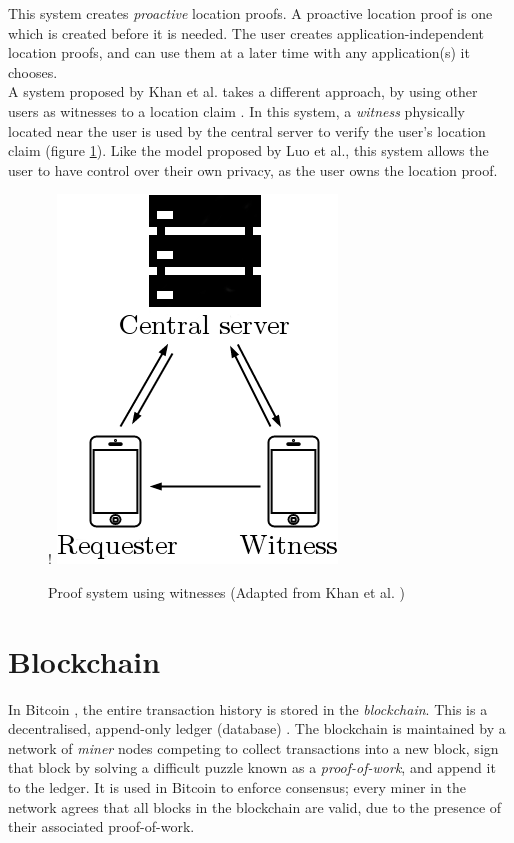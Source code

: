 This system creates \textit{proactive} location proofs. A proactive location proof is one which is created before it is needed. The user creates application-independent location proofs, and can use them at a later time with any application(s) it chooses.
\\

A system proposed by Khan et al. takes a different approach, by using other users as witnesses to a location claim \cite{khan}. In this system, a \textit{witness} physically located near the user is used by the central server to verify the user's location claim (figure \ref{fig:witness_paper}). Like the model proposed by Luo et al., this system allows the user to have control over their own privacy, as the user owns the location proof.

\begin{figure}[H]
\begin{center}
 {!} {\includegraphics{diagrams/witness_paper.png}}
\caption{Proof system using witnesses (Adapted from Khan et al. \cite{khan})}
\label{fig:witness_paper}
\end{center}
\end{figure}

\section{Blockchain}
In Bitcoin \cite{bitcoin}, the entire transaction history is stored in the \textit{blockchain}. This is a decentralised, append-only ledger (database) \cite{blueprint}. The blockchain is maintained by a network of \textit{miner} nodes competing to collect transactions into a new block, sign that block by solving a difficult puzzle known as a \textit{proof-of-work}, and append it to the ledger. It is used in Bitcoin to enforce consensus; every miner in the network agrees that all blocks in the blockchain are valid, due to the presence of their associated proof-of-work.

